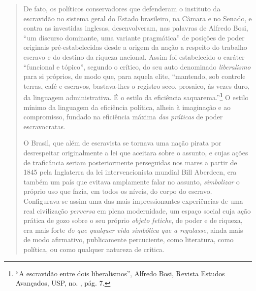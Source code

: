 \begin{quote}
De fato, os políticos conservadores que defenderam o instituto da
escravidão no sistema geral do Estado brasileiro, na Câmara e no Senado,
e contra as investidas inglesas, desenvolveram, nas palavras de Alfredo
Bosi, ``um discurso dominante, uma variante pragmática'' de posições de
poder originais pré-estabelecidas desde a origem da nação a respeito do
trabalho escravo e do destino da riqueza nacional. Assim foi
estabelecido o caráter ``funcional e tópico'', segundo o crítico, do seu
auto denominado \emph{liberalismo} para si próprios, de modo que, para
aquela elite, ``mantendo, sob controle terras, café e escravos,
bastava-lhes o registro seco, prosaico, às vezes duro, da linguagem
administrativa. É o estilo da eficiência saquarema.''\footnote{``A
  escravidão entre dois liberalismos'', Alfredo Bosi, Revista Estudos
  Avançados, USP, no. , pág. 7.} O estilo mínimo da linguagem da
eficiência política, alheia à imaginação e ao compromisso, fundado na
eficiência máxima \emph{das práticas} de poder escravocratas.

O Brasil, que além de escravista se tornava uma nação pirata por
desrespeitar originalmente a lei que aceitara sobre o assunto, e cujas
ações de traficância seriam posteriormente perseguidas nos mares a
partir de 1845 pela Inglaterra da lei intervencionista mundial Bill
Aberdeen, era também um país que evitava amplamente falar no assunto,
\emph{simbolizar} o próprio uso que fazia, em todos os níveis, do corpo
do escravo. Configurava-se assim uma das mais impressionantes
experiências de uma real civilização \emph{perversa} em plena
modernidade, um espaço social cuja ação prática de gozo sobre o seu
próprio \emph{objeto fetiche}, de poder e de riqueza, era mais forte
\emph{do que qualquer} \emph{vida simbólica que a regulasse}, ainda mais
de modo afirmativo, publicamente percuciente, como literatura, como
política, ou como qualquer natureza de crítica.


\end{quote}
